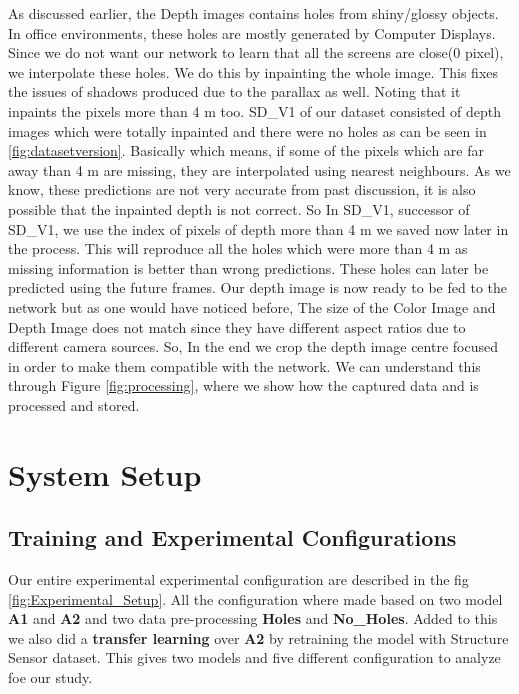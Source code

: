 As discussed earlier, the Depth images contains holes from shiny/glossy objects\cite{shiny}. In office environments, these holes are mostly generated by Computer Displays. Since we do not want our network to learn that all the screens are close(0 pixel), we interpolate these holes. We do this by inpainting \cite{inpainting} the whole image. This fixes the issues of shadows produced due to the parallax as well. Noting that it inpaints the pixels more than 4 m too. SD\_V1 of our dataset consisted of depth images which were totally inpainted and there were no holes as can be seen in \ref{fig:datasetversion}. Basically which means, if some of the pixels which are far away than 4 m are missing, they are interpolated using nearest neighbours. As we know, these predictions are not very accurate from past discussion, it is also possible that the inpainted depth is not correct. So In SD\_V1, successor of SD\_V1, we use the index of pixels of depth more than 4 m we saved now later in the process. This will reproduce all the holes which were more than 4 m as missing information is better than wrong predictions. These holes can later be predicted using the future frames. Our depth image is now ready to be fed to the network but as one would have noticed before, The size of the Color Image and Depth Image does not match since they have different aspect ratios due to different camera sources. So, In the end we crop the depth image centre focused in order to make them compatible with the network. We can understand this through Figure \ref{fig:processing}, where we show how the captured data and is processed and stored. \\



\newpage
\section{System Setup}
\label{Chapter5:Experimental_Setup}
\subsection{Training and Experimental Configurations}

 Our entire experimental experimental configuration are described in the fig \ref{fig:Experimental_Setup}. All the configuration where made based on two model \textbf{A1} and \textbf{A2} and two data pre-processing \textbf{Holes} and \textbf{No\_Holes}. Added to this we also did a \textbf{transfer learning} over \textbf{A2} by retraining the model with Structure Sensor dataset. This gives two models and five different configuration to analyze foe our study. 



